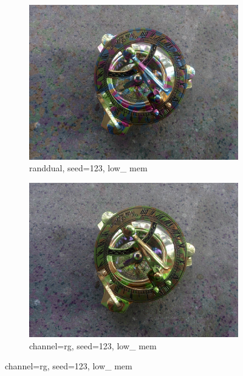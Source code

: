 \documentclass[15pt]{article}
\begin{document}
\begin{figure}
\begin{subfigure}[b]{0.48\linewidth}
\includegraphics[width=\linewidth]{randdual_lm_seed123.jpg}
\caption{randdual, seed=123, low\_ mem}
\end{subfigure}
\begin{subfigure}[b]{0.48\linewidth}
\includegraphics[width=\linewidth]{rg_lm_seed123.jpg}
\caption{channel=rg, seed=123, low\_ mem}
\end{subfigure}
\end{figure}
\end{document}

